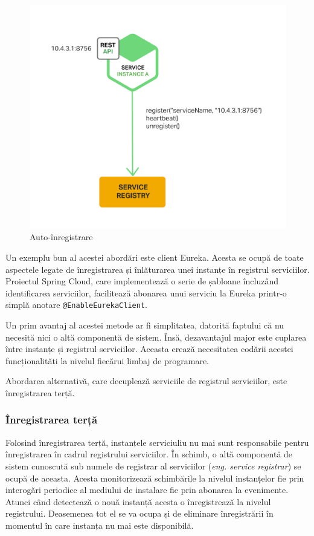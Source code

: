 \documentclass[12pt, a4paper, oneside, romanian]{teza-upb}
\begin{document}
\begin{figure}[ht]
\centering
\includegraphics[scale=0.3]{img/Richardson-microservices-part4-4_self-registration-pattern.png}
\caption{Auto-înregistrare}
\label{fig:arhi_componente}
\end{figure}

Un exemplu bun al acestei abordări este client Eureka. Acesta se ocupă de toate aspectele legate de înregistrarea și înlăturarea unei instanțe în registrul serviciilor. Proiectul Spring Cloud, care implementează o serie de șabloane încluzând identificarea serviciilor, facilitează abonarea unui serviciu la Eureka printr-o simplă anotare \texttt{@EnableEurekaClient}.

Un prim avantaj al acestei metode ar fi simplitatea, datorită faptului că nu necesită nici o altă componentă de sistem. Însă, dezavantajul major este cuplarea între instanțe și registrul serviciilor. Aceasta crează necesitatea codării acestei funcționalităti la nivelul fiecărui limbaj de programare.

Abordarea alternativă, care decuplează serviciile de registrul serviciilor, este înregistrarea terță.
\newpage
\subsubsection{Înregistrarea terță}
Folosind înregistrarea terță, instanțele serviciuliu nu mai sunt responsabile pentru înregistrarea în cadrul registrului serviciilor. În schimb, o altă componentă de sistem cunoscută sub numele de registrar al serviciilor (\textit{eng. service registrar}) se ocupă de aceasta. Acesta monitorizează schimbările la nivelul instanțelor fie prin interogări periodice al mediului de instalare fie prin abonarea la evenimente. Atunci când detectează o nouă instanță acesta o înregistrează la nivelul registrului. Deasemenea tot el se va ocupa și de eliminare înregistrării în momentul în care instanța nu mai este  disponibilă. 
\end{document}
